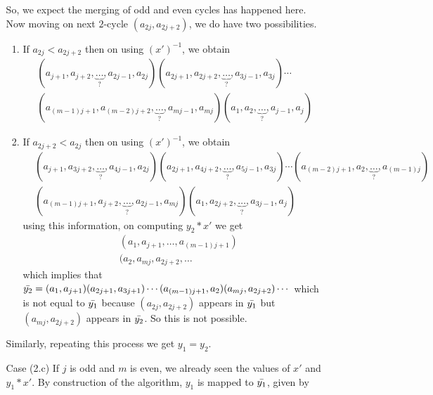 \documentclass[oneside]{amsart}
\theoremstyle{plain}
\theoremstyle{definition}
\theoremstyle{remark}
\begin{document}
\begin{enumerate}
\begin{enumerate}
                So, we expect the merging of odd and even cycles has happened here. Now moving on next $2$-cycle $(a_{2j}, a_{2j + 2})$, we do have two possibilities.
                \begin{enumerate}
                    \item If $a_{2j} < a_{2j + 2}$ then on using $(x')^{-1}$, we obtain
                    \begin{align*}
                        (a_{j + 1}, a_{j + 2}, \underbrace{\ldots}_{?}, a_{2j - 1},a _{2j})(a_{2j + 1}, a_{2j + 2}, \underbrace{\ldots}_{?}, a_{3j - 1}, a_{3j})\cdots\\(a_{(m - 1)j + 1}, a_{(m - 2)j + 2}, \underbrace{\ldots}_{?},a_{mj - 1}, a_{mj})(a_1, a_2, \underbrace{\ldots}_{?}, a_{j - 1}, a_j)
                    \end{align*}
                    \item If $a_{2j + 2} < a_{2j}$ then on using $(x')^{-1}$, we obtain
                    \begin{align*}
                        &(a_{j + 1}, a_{3j + 2}, \underbrace{\ldots}_{?}, a_{4j - 1},a _{2j})(a_{2j + 1}, a_{4j + 2}, \underbrace{\ldots}_{?}, a_{5j - 1}, a_{3j})\cdots(a_{(m - 2)j + 1}, a_{2}, \underbrace{\ldots}_{?}, a_{(m - 1)j})\\&(a_{(m - 1)j + 1}, a_{j + 2}, \underbrace{\ldots}_{?},a_{2j - 1}, a_{mj})(a_1, a_{2j + 2}, \underbrace{\ldots}_{?}, a_{3j - 1}, a_j)
                    \end{align*}
                    using this information, on computing $y_2*x'$ we get
                    \begin{align*}
                        &(a_1, a_{j + 1}, \ldots ,a_{(m - 1)j + 1})\\
                    &(a_2, a_{mj}, a_{2j + 2}, \ldots
                    \end{align*} which implies that $\Bar{y_2} = (a_1, a_{j + 1})(a_{2j + 1}, a_{3j + 1})\cdots(a_{(m - 1)j + 1}, a_2)(a_{mj}, a_{2j + 2})\cdots$ which is not equal to $\Bar{y_1}$ because $(a_{2j}, a_{2j + 2})$ appears in $\Bar{y_1}$ but $(a_{mj}, a_{2j + 2})$ appears in $\Bar{y_2}$. So this is not possible.
                \end{enumerate}
                Similarly, repeating this process we get $y_1 = y_2$.
                \item[Case (2.c)] If $j$ is odd and $m$ is even, we already seen the values of $x'$ and $y_1*x'$. By construction of the algorithm,
                $y_1$ is mapped to $\Bar{y_1}$, given by

\end{enumerate}
\end{enumerate}
\end{document}

